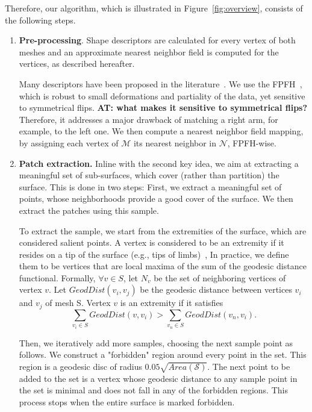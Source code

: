 \documentclass[10pt,twocolumn,letterpaper]{article}
\newcommand{\colornote}[3]{{\color{#1}\bf{#2: #3}\normalfont}}
\newcommand{\colornote}[3]{}
\newcommand {\ayellet}[1]{\colornote{blue}{AT}{#1}}
\begin{document}
Therefore, our algorithm, which is illustrated in Figure~\ref{fig:overview}, consists of the following steps.
\begin{enumerate}
    \item 
    \textbf{Pre-processing}.
    Shape descriptors are calculated for every vertex of both meshes and an approximate nearest neighbor field is computed for the vertices, as described hereafter.
    
    Many descriptors have been proposed in the literature~\cite{rusu2008towards,tombari2010unique,Sun:2009:CPI:1735603.1735621}.
    We use the FPFH~\cite{rusu2009fast}, which is robust to small deformations and partiality of the data, yet sensitive to symmetrical flips.
    \ayellet{what makes it sensitive to symmetrical flips?}
    Therefore, it addresses a major drawback of matching a right arm, for example, to the left one.
    We then compute a nearest neighbor field mapping, by assigning each vertex of $\mathcal{M}$ its nearest neighbor in $\mathcal{N}$, FPFH-wise.
    \item
    {\bf Patch extraction.} 
    Inline with the second key idea, we aim at extracting a meaningful set of sub-surfaces, which cover (rather than partition) the surface.
    This is done in two steps:
    First, we extract a meaningful set of points, whose neighborhoods provide a good cover of the surface. 
    We then extract the patches using this sample.
    
    To extract the sample, we start from the extremities of the surface, which are considered salient points.
    A vertex is considered to be an extremity if it  resides on a tip of the surface (e.g.,  tips of limbs)~\cite{katz2005mesh},
    In practice, we define them to be vertices that are local maxima of the sum of the geodesic distance functional.
    Formally, $\forall v \in S$,  let $N_v$ be the set of neighboring vertices of vertex $v$. 
    Let $GeodDist(v_i, v_j)$ be the geodesic distance between vertices $v_i$ and $v_j$ of mesh S. Vertex $v$ is an extremity if it satisfies
     \begin{equation}
        \sum_{v_i\in S} GeodDist(v,v_i)>\sum_{v_n\in S} GeodDist(v_n, v_i).
        \label{eq:extremities}
    \end{equation}

    Then, we iteratively add more samples, choosing the next sample point as follows.
    We construct a "forbidden" region around every point in the set.
    This region is a geodesic disc of radius $ 0.05\sqrt{Area(\mathcal{S})}$.
    The next point to be added to the set is a vertex whose geodesic distance to any sample point in the set is minimal and does not fall in any of the forbidden regions.
    This process stops when the entire surface is marked forbidden. 


\end{enumerate}
\end{document}

